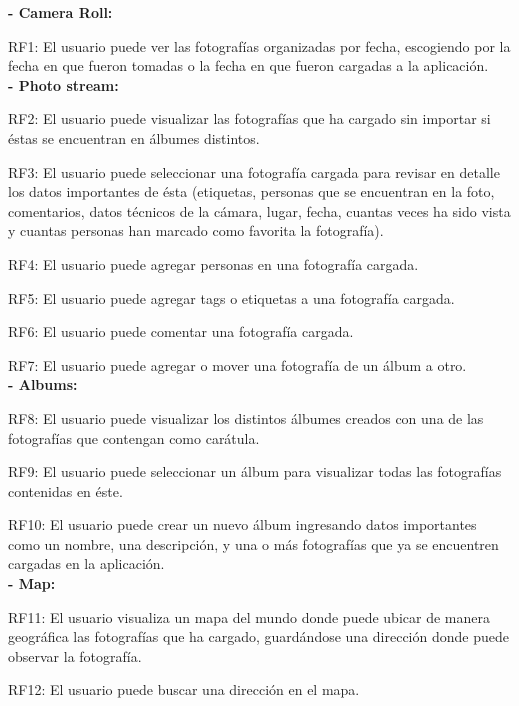 \documentclass{memoria}
\begin{document}



\textbf{- Camera Roll:}

RF1: El usuario puede ver las fotografías organizadas por fecha, escogiendo por la fecha en que fueron tomadas o la fecha en que fueron cargadas a la aplicación.\\

\textbf{- Photo stream:}

RF2: El usuario puede visualizar las fotografías que ha cargado sin importar si éstas se encuentran en álbumes distintos.

RF3: El usuario puede seleccionar una fotografía cargada para revisar en detalle los datos importantes de ésta (etiquetas, personas que se encuentran en la foto, comentarios, datos técnicos de la cámara, lugar, fecha, cuantas veces ha sido vista y cuantas personas han marcado como favorita la fotografía).

RF4: El usuario puede agregar personas en una fotografía cargada.

RF5: El usuario puede agregar tags o etiquetas a una fotografía cargada.

RF6: El usuario puede comentar una fotografía cargada.

RF7: El usuario puede agregar o mover una fotografía de un álbum a otro.\\

\textbf{- Albums:}

RF8: El usuario puede visualizar los distintos álbumes creados con una de las fotografías que contengan como carátula.

RF9: El usuario puede seleccionar un álbum para visualizar todas las fotografías contenidas en éste.

RF10: El usuario puede crear un nuevo álbum ingresando datos importantes como un nombre, una descripción, y una o más fotografías que ya se encuentren cargadas en la aplicación. \\

\textbf{- Map:}

RF11: El usuario visualiza un mapa del mundo donde puede ubicar de manera geográfica las fotografías que ha cargado, guardándose una dirección donde puede observar la fotografía. 

RF12: El usuario puede buscar una dirección en el mapa. \\
\end{document}
